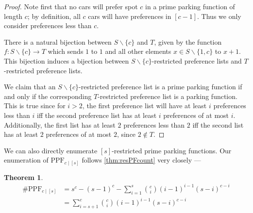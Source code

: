 \documentclass[12 pt]{amsart}
\newtheorem{theorem}{Theorem}[section]
\theoremstyle{definition} %
\theoremstyle{remark} %
\begin{document}
\begin{proof}
    Note first that no cars will prefer spot $c$ in a prime parking function of length $c$; by definition, all $c$ cars will have preferences in $[c-1]$. Thus we only consider preferences less than $c$.

    There is a natural bijection between $S\backslash\{c\}$ and $T$, given by the function $f:S\backslash\{c\}\to T$ which sends $1$ to $1$ and all other elements $x\in S\backslash\{1,c\}$ to $x+1$. This bijection induces a bijection between $S\backslash\{c\}$-restricted preference lists and $T$-restricted preference lists.

    We claim that an $S\backslash\{c\}$-restricted preference list is a prime parking function if and only if the corresponding $T$-restricted preference list is a parking function. This is true since for $i>2$, the first preference list will have at least $i$ preferences less than $i$ iff the second preference list has at least $i$ preferences of at most $i$. Additionally, the first list has at least $2$ preferences less than $2$ iff the second list has at least $2$ preferences of at most $2$, since $2\not\in T$.
\end{proof}

We can also directly enumerate $[s]$-restricted prime parking functions. Our enumeration of $\mathrm{PPF}_{c \mid [s]}$ follows \cref{thm:resPFcount} very closely ---
\begin{theorem}
	\label{thm:resPPFcount}
	\[
		\begin{split}
			\# \mathrm{PPF}_{c \mid [s]} & = s^{c} - (s - 1)^{c} - \sum_{i = 1}^{s} \binom{c}{i} (i - 1)^{i - 1} (s - i)^{c - i} \\
						     & = \sum_{i = s + 1}^{c} \binom{c}{i} (i - 1)^{i - 1} (s - i)^{c - i}
		\end{split}
	\]
\end{theorem}
\end{document}
